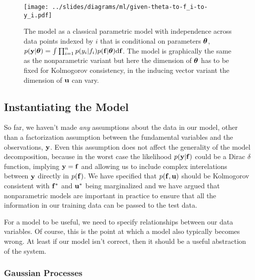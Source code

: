 \documentclass[a4paperpaper,]{article}
\begin{document}
\begin{figure}[htb]
\texttt{[image: ../slides/diagrams/ml/given-theta-to-f\_i-to-y\_i.pdf]}


\caption{The model as a classical parametric model with independence across data points indexed by $i$ that is conditional on parameters $\boldsymbol{ \theta}$, $p(\mathbf{ y}|\boldsymbol{ \theta}) = \int\prod_{i=1}^n p(y_i|f_i) p(\mathbf{ f}|\boldsymbol{ \theta})\text{d}\mathbf{ f}$. The model is graphically the same as the nonparametric variant but here the dimension of $\boldsymbol{ \theta}$ has to be fixed for Kolmogorov consistency, in the inducing vector variant the dimension of $\mathbf{ u}$ can vary.}
\label{given-theta-to-f_i-to-y_i}
\end{figure}

\hypertarget{instantiating-the-model}{%
\subsection{Instantiating the Model}\label{instantiating-the-model}}

So far, we haven't made \emph{any} assumptions about the data in our
model, other than a factorization assumption between the fundamental
variables and the observations, \(\mathbf{ y}\). Even this assumption
does not affect the generality of the model decomposition, because in
the worst case the likelihood \(p(\mathbf{ y}|\mathbf{ f})\)
could be a Dirac \(\delta\) function, implying
\(\mathbf{ y}=\mathbf{ f}\) and allowing us to include
complex interelations between \(\mathbf{ y}\) directly in
\(p(\mathbf{ f})\). We have specified that
\(p(\mathbf{ f}, \mathbf{ u})\) should be Kolmogorov
consistent with \(\mathbf{ f}^*\) and \(\mathbf{ u}^*\)
being marginalized and we have argued that nonparametric models are
important in practice to ensure that all the information in our training
data can be passed to the test data.

For a model to be useful, we need to specify relationships between our
data variables. Of course, this is the point at which a model also
typically becomes wrong. At least if our model isn't correct, then it
should be a useful abstraction of the system.

\hypertarget{gaussian-processes}{%
\subsubsection{Gaussian Processes}\label{gaussian-processes}}
\end{document}
